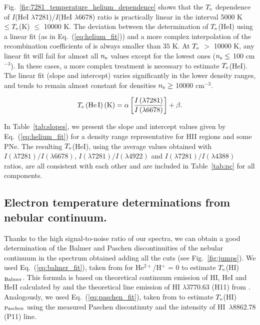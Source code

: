 \documentclass[fleqn,usenatbib]{mnras}
\begin{document}
Fig.~\ref{fig:7281_temperature_helium_dependence} shows that the $T_{\rm e}$ dependence of $I$(\mbox{He}\thinspace \mbox{I} $\lambda$7281)/$I$(\mbox{He}\thinspace \mbox{I} $\lambda$6678) ratio is practically linear in the interval 5000 K $\leq T_{\rm e}$(K) $\leq$ 10000 K. The deviation between the determination of $T_{\rm e}$(\mbox{He}\thinspace \mbox{I}) using a linear fit (as in Eq.~(\ref{eq:helium_fit})) and a more complex interpolation of the recombination coefficients of \citet{Porter12,Porter13} is always smaller than $35 \text{ K}$. At $T_{\rm e}$ $>$ 10000 K, any linear fit will fail for almost all $n_{\rm e}$ values except for the lowest ones ($n_{\rm e}\leq$ 100 cm$^{-3}$). In these cases, a more complex treatment is necessary to estimate $T_{\rm e}$(He\thinspace I).  The linear fit (slope and intercept) varies significantly in the lower density ranges, and tends to remain almost constant for densities $n_{\rm e}\geq$ 10000 cm$^{-3}$.

\begin{equation}
    \label{eq:helium_fit}
    T_{\text e}\left(\mbox{He}\thinspace \mbox{I} \right) ({\text K})=\alpha \left[ \frac{I\left(\lambda7281\right)}{I\left(\lambda6678 \right)} \right]+\beta.
\end{equation}

In Table~\ref{tab:slopes}, we present the slope and intercept values given by Eq.~(\ref{eq:helium_fit}) for a density range representative for H\thinspace II regions and some PNe. The resulting $T_{\rm e}$(\mbox{He}\thinspace \mbox{I}), using the average values  obtained with $I(\lambda7281)/I(\lambda6678 )$, $I(\lambda7281)/I(\lambda4922 )$ and $I(\lambda7281)/I(\lambda4388)$ ratios, are all consistent with each other and are included in Table~\ref{tab:pc} for all components.


\subsection{Electron temperature determinations from nebular continuum.}
\label{subsec:balmer_paschen_jumps}

 Thanks to the high signal-to-noise ratio of our spectra, we can obtain a good determination of the Balmer and Paschen discontinuities of the nebular continuum in the spectrum obtained adding all the cuts (see Fig.~\ref{fig:jumps}). We used Eq.~(\ref{eq:balmer_fit}), taken from \citet{liu01} for He$^{2+}$/H$^+$ = 0 to estimate $T_{\rm e}$(H\thinspace I)$_{\rm Balmer}$. This formula is based on theoretical continuum emission of H\thinspace I, He\thinspace I and He\thinspace II calculated by \citet{brownymathews70} and the theoretical line emission of \mbox{H}\thinspace \mbox{I} $\lambda 3770.63$ (H11) from \citet{Storey95}. 
Analogously, we used Eq.~(\ref{eq:paschen_fit}), taken from \citet{fangyliu11} to estimate $T_{\rm e}$(H\thinspace I)$_{\rm Paschen}$ using the measured Paschen discontinuty and the intensity of  \mbox{H}\thinspace \mbox{I }$\lambda 8862.78$ (P11) line. 
\end{document}
